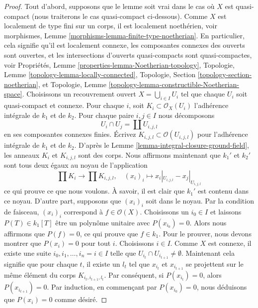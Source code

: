 \begin{proof}
Tout d'abord, supposons que le lemme soit vrai dans le cas où
$X$ est quasi-compact (nous traiterons le cas quasi-compact
ci-dessous). Comme $X$ est localement de type fini sur un
corps, il est localement noethérien, voir morphismes, Lemme
\ref{morphisms-lemma-finite-type-noetherian}. En particulier,
cela signifie qu'il est localement connexe, les composantes
connexes des ouverts sont ouvertes, et les intersections
d'ouverts quasi-compacts sont quasi-compactes, voir
Propriétés, Lemme \ref{properties-lemma-Noetherian-topology},
Topologie, Lemme \ref{topology-lemma-locally-connected},
Topologie, Section \ref{topology-section-noetherian}, et
Topologie, Lemme
\ref{topology-lemma-constructible-Noetherian-space}. Choisissons un
recouvrement ouvert $X = \bigcup_{i \in I} U_i$ tel que chaque $U_i$ soit
quasi-compact et connexe. Pour chaque $i$, soit $K_i \subset \mathcal{O}_X(U_i)$
l'adhérence intégrale de $k_1$ et de $k_2$. Pour chaque paire $i, j \in I$ nous décomposons
$$
U_i \cap U_j = \coprod U_{i, j, l}
$$
en ses composantes connexes finies. Écrivez $K_{i, j, l}
\subset \mathcal{O}(U_{i, j, l})$ pour l'adhérence
intégrale de $k_1$ et de $k_2$. D'après le Lemme
\ref{lemma-integral-closure-ground-field}, les anneaux $K_i$
et $K_{i, j, l}$ sont des corps. Nous affirmons maintenant que
$k_1'$ et $k_2'$ sont tous deux égaux au noyau de l'application
$$
\prod K_i \longrightarrow \prod K_{i, j, l}, \quad
(x_i)_i \longmapsto x_i|_{U_{i, j, l}} - x_j|_{U_{i, j, l}}
$$
ce qui prouve ce que nous voulons. À savoir, il est clair que
$k_1'$ est contenu dans ce noyau. D'autre part, supposons que
$(x_i)_i$ soit dans le noyau. Par la condition de faisceau,
$(x_i)_i$ correspond à $f \in \mathcal{O}(X)$. Choisissons un
$i_0 \in I$ et laissons $P(T) \in k_1[T]$ être un polynôme
unitaire avec $P(x_{i_0}) = 0$. Alors nous affirmons que $P(f) =
0$, ce qui prouve que $f \in k_1$. Pour le prouver, nous devons
montrer que $P(x_i) = 0$ pour tout $i$. Choisissons $i \in I$.
Comme $X$ est connexe, il existe une suite $i_0, i_1, \ldots, i_n =
i \in I$ telle que $U_{i_t} \cap U_{i_{t + 1}} \not = \emptyset$.
Maintenant cela signifie que pour chaque $t$, il existe un $l_t$
tel que $x_{i_t}$ et $x_{i_{t + 1}}$ se projettent sur le même
élément du corps $K_{i_t, i_{t + 1}, l_t}$. Par conséquent, si
$P(x_{i_t}) = 0$, alors $P(x_{i_{t + 1}}) = 0$. Par induction, en
commençant par $P(x_{i_0}) = 0$, nous déduisons que $P(x_i) = 0$ comme désiré.


\end{proof}
